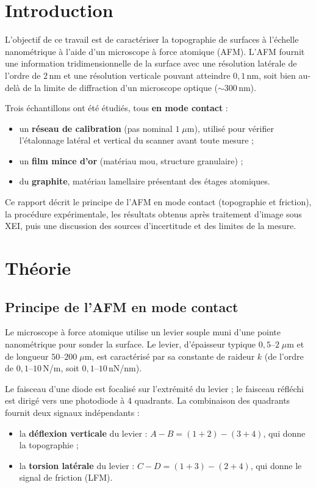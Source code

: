 \documentclass[a4paper,10pt]{article}
\begin{document}
\section{Introduction}

L'objectif de ce travail est de caractériser la topographie de surfaces à
l'échelle nanométrique à l'aide d'un microscope à force atomique (AFM). L'AFM fournit une information tridimensionnelle de la surface avec une résolution latérale de l'ordre de $2$\,nm et une résolution verticale pouvant atteindre $0{,}1$\,nm, soit bien au-delà de la limite de diffraction d'un microscope optique ($\sim 300$\,nm).

Trois échantillons ont été étudiés, tous \textbf{en mode contact} :
\begin{itemize}
    \item un \textbf{réseau de calibration} (pas nominal $1\;\mu$m), utilisé pour
          vérifier l'étalonnage latéral et vertical du scanner avant toute mesure ;
    \item un \textbf{film mince d'or} (matériau mou, structure granulaire) ;
    \item du \textbf{graphite}, matériau
          lamellaire présentant des étages atomiques.
\end{itemize}

Ce rapport décrit le principe de l'AFM en mode contact (topographie et friction), la procédure expérimentale, les résultats obtenus après traitement d'image sous XEI, puis une discussion des sources d'incertitude et des limites de la mesure.

\section{Théorie}

\subsection{Principe de l'AFM en mode contact}

Le microscope à force atomique utilise un levier souple
muni d'une pointe nanométrique pour sonder la surface. Le levier, d'épaisseur typique $0{,}5$--$2\;\mu$m et de longueur $50$--$200\;\mu$m, est caractérisé par sa constante de raideur $k$ (de l'ordre de $0{,}1$--$10$\,N/m, soit $0{,}1$--$10$\,nN/nm).

Le faisceau d'une diode est focalisé sur l'extrémité du levier ; le faisceau réfléchi est dirigé vers une photodiode à 4 quadrants. La combinaison des quadrants fournit deux signaux indépendants :
\begin{itemize}
    \item la \textbf{déflexion verticale} du levier : $A-B = (1+2)-(3+4)$, qui
          donne la topographie ;
    \item la \textbf{torsion latérale} du levier : $C-D = (1+3)-(2+4)$, qui donne
          le signal de friction (LFM).
\end{itemize}
\end{document}
